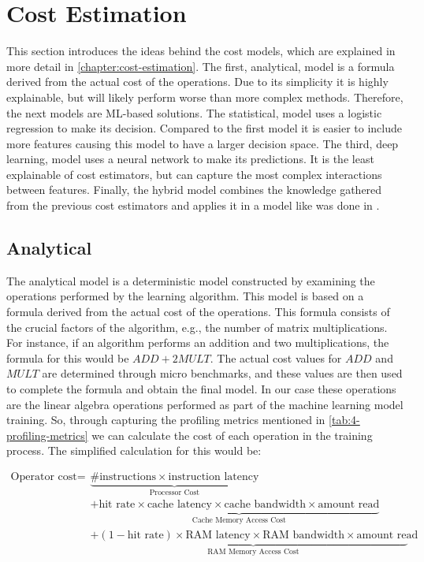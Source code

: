 \section{Cost Estimation}
\label{sec:4-cost-estimation}

This section introduces the ideas behind the cost models, which are explained in more detail in \autoref{chapter:cost-estimation}. The first, analytical, model is a formula derived from the actual cost of the operations. Due to its simplicity it is highly explainable, but will likely perform worse than more complex methods. Therefore, the next models are ML-based solutions. The statistical, model uses a logistic regression to make its decision. Compared to the first model it is easier to include more features causing this model to have a larger decision space. The third, deep learning, model uses a neural network to make its predictions. It is the least explainable of cost estimators, but can capture the most complex interactions between features. Finally, the hybrid model combines the knowledge gathered from the previous cost estimators and applies it in a model like was done in \cite{halide_cost_model}.

\subsection{Analytical}
The analytical model is a deterministic model constructed by examining the operations performed by the learning algorithm. This model is based on a formula derived from the actual cost of the operations. This formula consists of the crucial factors of the algorithm, e.g., the number of matrix multiplications. For instance, if an algorithm performs an addition and two multiplications, the formula for this would be $ADD + 2MULT$. The actual cost values for $ADD$ and $MULT$ are determined through micro benchmarks, and these values are then used to complete the formula and obtain the final model. In our case these operations are the linear algebra operations performed as part of the machine learning model training. So, through capturing the profiling metrics mentioned in \autoref{tab:4-profiling-metrics} we can calculate the cost of each operation in the training process. The simplified calculation for this would be:

\vspace{-0.5cm}
\begin{align*}
  \text{{Operator cost}} = & \underbrace{\# \text{{instructions}} \times \text{{instruction latency}}}_{\text{{Processor Cost}}}                                                            \\
                           & + \underbrace{\text{{hit rate}} \times \text{{cache latency}} \times \text{{cache bandwidth}} \times \text{{amount read}}}_{\text{{Cache Memory Access Cost}}} \\
                           & + \underbrace{(1 - \text{{hit rate}}) \times \text{{RAM latency}} \times \text{{RAM bandwidth}} \times \text{{amount read}}}_{\text{{RAM Memory Access Cost}}}
\end{align*}

